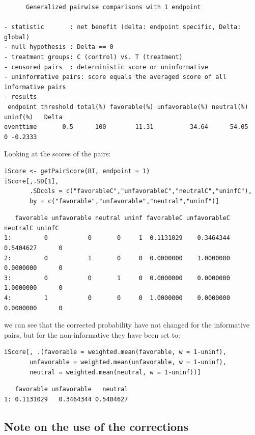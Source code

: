 \documentclass[12pt]{article}
\begin{document}
\begin{verbatim}
      Generalized pairwise comparisons with 1 endpoint

- statistic       : net benefit (delta: endpoint specific, Delta: global) 
- null hypothesis : Delta == 0 
- treatment groups: C (control) vs. T (treatment) 
- censored pairs  : deterministic score or uninformative
- uninformative pairs: score equals the averaged score of all informative pairs
- results
 endpoint threshold total(%) favorable(%) unfavorable(%) neutral(%) uninf(%)   Delta
eventtime       0.5      100        11.31          34.64      54.05        0 -0.2333
\end{verbatim}


Looking at the scores of the pairs:
\lstset{language=r,label= ,caption= ,captionpos=b,numbers=none}
\begin{lstlisting}
iScore <- getPairScore(BT, endpoint = 1)
iScore[,.SD[1], 
       .SDcols = c("favorableC","unfavorableC","neutralC","uninfC"),
       by = c("favorable","unfavorable","neutral","uninf")]
\end{lstlisting}

\begin{verbatim}
   favorable unfavorable neutral uninf favorableC unfavorableC  neutralC uninfC
1:         0           0       0     1  0.1131029    0.3464344 0.5404627      0
2:         0           1       0     0  0.0000000    1.0000000 0.0000000      0
3:         0           0       1     0  0.0000000    0.0000000 1.0000000      0
4:         1           0       0     0  1.0000000    0.0000000 0.0000000      0
\end{verbatim}


we can see that the corrected probability have not changed for the
informative pairs, but for the non-informative they have been set to:
\lstset{language=r,label= ,caption= ,captionpos=b,numbers=none}
\begin{lstlisting}
iScore[, .(favorable = weighted.mean(favorable, w = 1-uninf), 
	   unfavorable = weighted.mean(unfavorable, w = 1-uninf), 
	   neutral = weighted.mean(neutral, w = 1-uninf))]
\end{lstlisting}

\begin{verbatim}
   favorable unfavorable   neutral
1: 0.1131029   0.3464344 0.5404627
\end{verbatim}

\subsection{Note on the use of the corrections}
\label{sec:orgc41a4a8}
\end{document}
